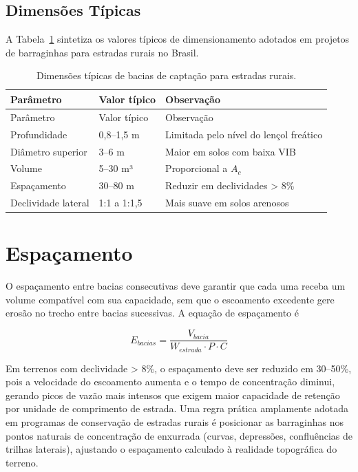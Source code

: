 \documentclass[
  portuguese,
  11pt,
  a4paper,
  open=any]{scrbook}
\begin{document}
\subsection{Dimensões Típicas}\label{dimensuxf5es-tuxedpicas}

A Tabela~\ref{tbl-dimensoes-bacia} sintetiza os valores típicos de
dimensionamento adotados em projetos de barraginhas para estradas rurais
no Brasil.

\begin{longtable}[]{@{}lll@{}}
\caption{Dimensões típicas de bacias de captação para estradas
rurais.}\label{tbl-dimensoes-bacia}\tabularnewline
\toprule\noalign{}
Parâmetro & Valor típico & Observação \\
\midrule\noalign{}
\endfirsthead
\toprule\noalign{}
Parâmetro & Valor típico & Observação \\
\midrule\noalign{}
\endhead
\bottomrule\noalign{}
\endlastfoot
Profundidade & 0,8--1,5 m & Limitada pelo nível do lençol freático \\
Diâmetro superior & 3--6 m & Maior em solos com baixa VIB \\
Volume & 5--30 m³ & Proporcional a \(A_c\) \\
Espaçamento & 30--80 m & Reduzir em declividades \textgreater{} 8\% \\
Declividade lateral & 1:1 a 1:1,5 & Mais suave em solos arenosos \\
\end{longtable}

\section{Espaçamento}\label{espauxe7amento}

O espaçamento entre bacias consecutivas deve garantir que cada uma
receba um volume compatível com sua capacidade, sem que o escoamento
excedente gere erosão no trecho entre bacias sucessivas. A equação de
espaçamento é

\[
E_{bacias} = \frac{V_{bacia}}{W_{estrada} \cdot P \cdot C}
\]

Em terrenos com declividade \textgreater{} 8\%, o espaçamento deve ser
reduzido em 30--50\%, pois a velocidade do escoamento aumenta e o tempo
de concentração diminui, gerando picos de vazão mais intensos que exigem
maior capacidade de retenção por unidade de comprimento de estrada. Uma
regra prática amplamente adotada em programas de conservação de estradas
rurais é posicionar as barraginhas nos pontos naturais de concentração
de enxurrada (curvas, depressões, confluências de trilhas laterais),
ajustando o espaçamento calculado à realidade topográfica do terreno.
\end{document}
